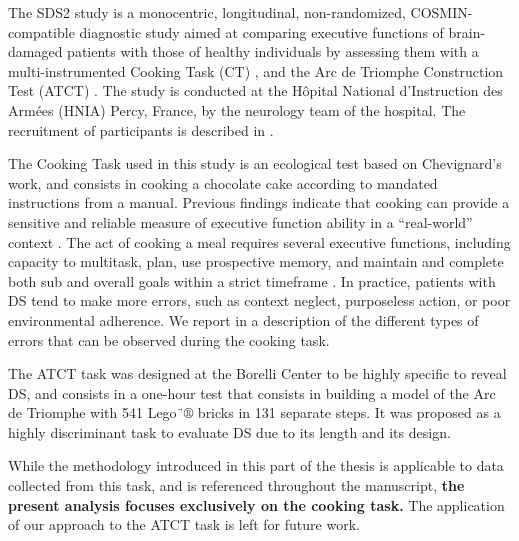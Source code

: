 The SDS2 study is a monocentric, longitudinal, non-randomized, COSMIN-compatible \cite{Terwee2018} diagnostic study aimed at comparing executive functions of brain-damaged patients with those of healthy individuals by assessing them with a multi-instrumented Cooking Task (CT) \cite{Chevignard2008}, and the Arc de Triomphe Construction Test (ATCT) \cite{Campos2023}. The study is conducted at the Hôpital National d’Instruction des Armées (HNIA) Percy, France, by the neurology team of the hospital. The recruitment of participants is described in .

The Cooking Task used in this study is an ecological test based on Chevignard’s work\cite{Chevignard2008}, and consists in cooking a chocolate cake according to mandated instructions from a manual. Previous findings indicate that cooking can provide a sensitive and reliable measure of executive function ability in a “real-world” context \cite{Chevignard2008, Doherty2015}. The act of cooking a meal requires several executive functions, including capacity to multitask, plan, use prospective memory, and maintain and complete both sub and overall goals within a strict timeframe \cite{craik2006cognition}. In practice, patients with DS tend to make more errors, such as context neglect, purposeless action, or poor environmental adherence. We report in  a description of the different types of errors that can be observed during the cooking task.

The ATCT task was designed at the Borelli Center to be highly specific to reveal DS, and consists in a one-hour test that consists in building a model of the Arc de Triomphe with 541 Lego$¨\circledR$ bricks in 131 separate steps. It was proposed as a highly discriminant task to evaluate DS due to its length and its design. 




While the methodology introduced in this part of the thesis is applicable to data collected from this task, and is referenced throughout the manuscript, \textbf{the present analysis focuses exclusively on the cooking task.} The application of our approach to the ATCT task is left for future work.





